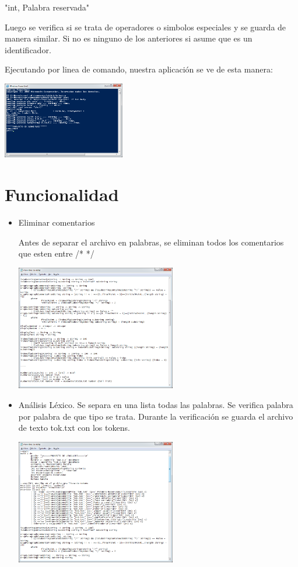 \documentclass[12pt,oneside]{book}
\begin{document}
	"int, Palabra reservada"

	Luego se verifica si se trata de operadores o simbolos especiales y se guarda de manera similar. Si no es ninguno de los anteriores si asume que es un identificador.

	Ejecutando por linea de comando, nuestra aplicación se ve de esta manera:

	\includegraphics[width=0.4\textwidth]{./imagenes/wps.png}

	
\chapter{Funcionalidad}

\begin{itemize}
\item  Eliminar comentarios

	Antes de separar el archivo en palabras, se eliminan todos los comentarios que esten entre /* */

	\includegraphics[width=0.55\textwidth]{./imagenes/codigoEliminarComentarios.png}


\item  Análisis Léxico.
	Se separa en una lista todas las palabras. Se verifica palabra por palabra de que tipo se trata. Durante la verificación se guarda el archivo de texto tok.txt con los tokens.

	\includegraphics[width=0.55\textwidth]{./imagenes/codigo.png}

\end{itemize}
\end{document}

